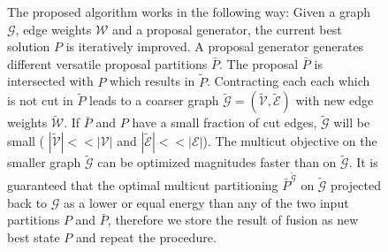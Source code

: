 \begin{figure}[H]
\caption{
    The proposed algorithm works in the following way:
    Given a graph $\mathcal{G}$, edge weights $\mathcal{W}$ and
    a proposal generator, the current best solution $P$ is iteratively improved.
    A proposal generator generates different versatile
    proposal partitions $\bar{P}$.
    The proposal  $\bar{P}$ is intersected with $P$ which results in
    $\tilde{P}$. Contracting each each which is not 
    cut in $\tilde{P}$ leads to a coarser graph  
    $\tilde{\mathcal{G}} = ( \tilde{\mathcal{V}}, \tilde{\mathcal{E}} )$ 
    with new edge weights $\tilde{\mathcal{W}}$.
    If  $\bar{P}$ and $P$ have a small fraction of cut edges, $\tilde{\mathcal{G}}$ will be small ( $|\tilde{\mathcal{V}}| << |\mathcal{V}|$
    and $|\tilde{\mathcal{E}}| << |\mathcal{E}|$).
    The multicut objective on the smaller graph $\tilde{\mathcal{G}}$ can be optimized magnitudes 
    faster than on $\tilde{\mathcal{G}}$.
    It is guaranteed that the optimal multicut partitioning $\bar{P}^{\tilde{\mathcal{G}}}$ on $\tilde{\mathcal{G}}$ projected 
    back to $\mathcal{G}$ as a lower or equal energy than any of the two input partitions $P$ and $\bar{P}$, 
    therefore we store the result of fusion as new best state $P$ and repeat the procedure.
}\label{fig:algo_graph}
\end{figure}


\begin{figure}[H]

%




\end{figure}

